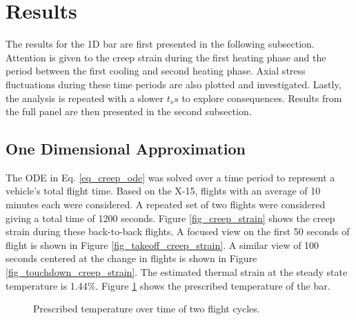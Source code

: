 \documentclass[conf]{new-aiaa}
\begin{document}
\section{Results}  %

The results for the 1D bar are first presented in the following 
subsection.
Attention is given to the creep strain during the
first heating phase and the period between the
first cooling and second heating phase.
Axial stress fluctuations during these time 
periods are also plotted and investigated.
Lastly, the analysis is repeated with a slower 
$t_ss$ to explore consequences. 
Results from the full panel are then presented in the
second subsection.

\subsection{One Dimensional Approximation}
The ODE in Eq. \ref{eq_creep_ode} was solved over a time period to represent a
vehicle's total flight time.
Based on the X-15, flights with an average of 10 minutes each 
\cite{ kordes_structureal_heating_experiencs_on_the_x15_airplane}
were considered.
A repeated set of two flights were considered giving a total time of 1200 seconds.
Figure \ref{fig_creep_strain} shows
the creep strain during these back-to-back flights.
A focused view on the first 50 seconds of flight is shown 
in Figure \ref{fig_takeoff_creep_strain}.
A similar view of 100 seconds centered at the change in flights is 
shown in Figure \ref{fig_touchdown_creep_strain}.
The estimated thermal strain at the steady state temperature is 1.44\%.
Figure \ref{fig_full_temperature} shows the prescribed temperature of the bar.

\begin{figure}[H]
  \centering
  \caption{ Prescribed temperature over time of two flight cycles.}
  \label{fig_full_temperature}
\end{figure}
\end{document}

